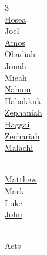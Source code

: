 \begin{multicols}{3}
\\
\hspace{1em}\hyperlink{book-hosea}{Hosea}\\
\hspace{1em}\hyperlink{book-joel}{Joel}\\
\hspace{1em}\hyperlink{book-amos}{Amos}\\
\hspace{1em}\hyperlink{book-obadiah}{Obadiah}\\
\hspace{1em}\hyperlink{book-jonah}{Jonah}\\
\hspace{1em}\hyperlink{book-micah}{Micah}\\
\hspace{1em}\hyperlink{book-nahum}{Nahum}\\
\hspace{1em}\hyperlink{book-habakkuk}{Habakkuk}\\
\hspace{1em}\hyperlink{book-zephaniah}{Zephaniah}\\
\hspace{1em}\hyperlink{book-haggai}{Haggai}\\
\hspace{1em}\hyperlink{book-zechariah}{Zechariah}\\
\hspace{1em}\hyperlink{book-malachi}{Malachi}\\
\vspace{4pt}

\\
\hspace{1em}\hyperlink{book-matthew}{Matthew}\\
\hspace{1em}\hyperlink{book-mark}{Mark}\\
\hspace{1em}\hyperlink{book-luke}{Luke}\\
\hspace{1em}\hyperlink{book-john}{John}\\
\vspace{4pt}

\\
\hspace{1em}\hyperlink{book-acts}{Acts}\\
\vspace{4pt}


\end{multicols}
